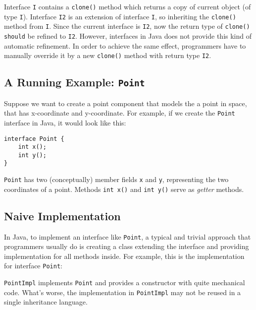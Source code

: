 Interface \texttt{I} contains a \texttt{clone()} method which returns a copy of
current object (of type \texttt{I}). Interface \texttt{I2} is an extension of
interface \texttt{I}, so inheriting the \texttt{clone()} method from
\texttt{I}. Since the current interface is \texttt{I2}, now the return type of
\texttt{clone()} \texttt{should} be refined to \texttt{I2}. However, interfaces
in Java does not provide this kind of automatic refinement. In order to achieve
the same effect, programmers have to manually override it by a new
\texttt{clone()} method with return type \texttt{I2}.


\subsection{A Running Example: \texttt{Point}}
Suppose we want to create a point component that models the a point in space,
that has x-coordinate and y-coordinate. For example, if we create the
\texttt{Point} interface in Java, it would look like this:

\begin{lstlisting}
interface Point {
    int x();
    int y(); 
}
\end{lstlisting}

\texttt{Point} has two (conceptually) member fields \texttt{x} and \texttt{y},
representing the two coordinates of a point. Methods \texttt{int x()} and
\texttt{int y()} serve as \emph{getter} methods. 

\subsection{Naive Implementation}
In Java, to implement an interface like \texttt{Point}, a typical and trivial
approach that programmers usually do is creating a class extending the interface
and providing implementation for all methods inside. For example, this is the
implementation for interface \texttt{Point}:


\texttt{PointImpl} implements \texttt{Point} and provides a constructor with
quite mechanical code. What's worse, the implementation in \texttt{PointImpl}
may not be reused in a single inheritance language.


